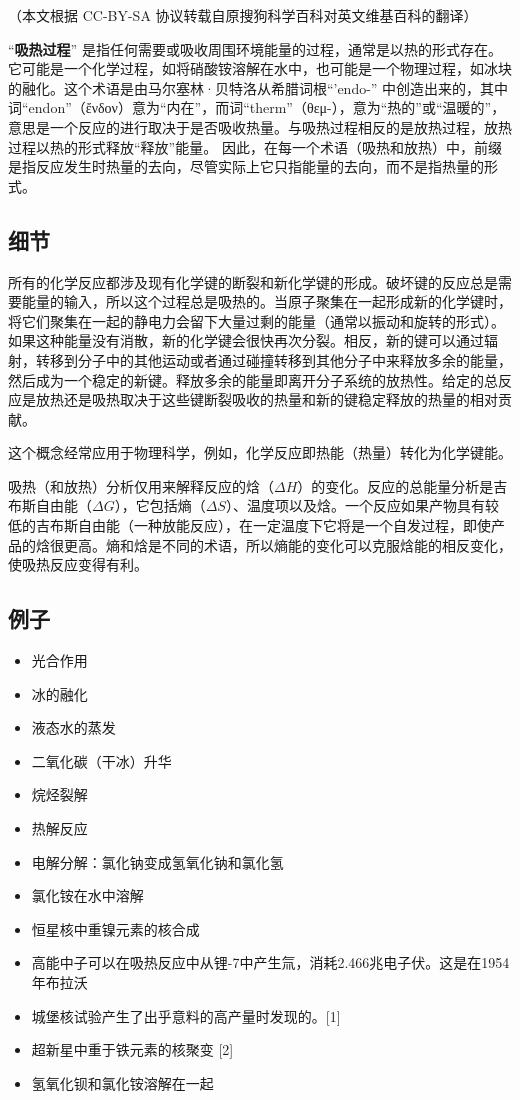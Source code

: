 
（本文根据 CC-BY-SA 协议转载自原搜狗科学百科对英文维基百科的翻译）

“\textbf{吸热过程}” 是指任何需要或吸收周围环境能量的过程，通常是以热的形式存在。它可能是一个化学过程，如将硝酸铵溶解在水中，也可能是一个物理过程，如冰块的融化。这个术语是由马尔塞林·贝特洛从希腊词根“'endo-” 中创造出来的，其中词“endon”（ἔνδον）意为“内在”，而词“therm”（θεμ-），意为“热的”或“温暖的”，意思是一个反应的进行取决于是否吸收热量。与吸热过程相反的是放热过程，放热过程以热的形式释放“释放”能量。 因此，在每一个术语（吸热和放热）中，前缀是指反应发生时热量的去向，尽管实际上它只指能量的去向，而不是指热量的形式。

\subsection{细节}
所有的化学反应都涉及现有化学键的断裂和新化学键的形成。破坏键的反应总是需要能量的输入，所以这个过程总是吸热的。当原子聚集在一起形成新的化学键时，将它们聚集在一起的静电力会留下大量过剩的能量（通常以振动和旋转的形式）。如果这种能量没有消散，新的化学键会很快再次分裂。相反，新的键可以通过辐射，转移到分子中的其他运动或者通过碰撞转移到其他分子中来释放多余的能量，然后成为一个稳定的新键。释放多余的能量即离开分子系统的放热性。给定的总反应是放热还是吸热取决于这些键断裂吸收的热量和新的键稳定释放的热量的相对贡献。

这个概念经常应用于物理科学，例如，化学反应即热能（热量）转化为化学键能。

吸热（和放热）分析仅用来解释反应的焓（$\Delta H$）的变化。反应的总能量分析是吉布斯自由能（$\Delta G$），它包括熵（$\Delta S$）、温度项以及焓。一个反应如果产物具有较低的吉布斯自由能（一种放能反应），在一定温度下它将是一个自发过程，即使产品的焓很更高。熵和焓是不同的术语，所以熵能的变化可以克服焓能的相反变化，使吸热反应变得有利。

\subsection{例子}
\begin{itemize}
\item 光合作用
\item 冰的融化
\item 液态水的蒸发
\item 二氧化碳（干冰）升华
\item 烷烃裂解
\item 热解反应
\item 电解分解：氯化钠变成氢氧化钠和氯化氢
\item 氯化铵在水中溶解
\item 恒星核中重镍元素的核合成
\item 高能中子可以在吸热反应中从锂-7中产生氚，消耗2.466兆电子伏。这是在1954年布拉沃\item 城堡核试验产生了出乎意料的高产量时发现的。[1]
\item 超新星中重于铁元素的核聚变 [2]
\item 氢氧化钡和氯化铵溶解在一起
\end{itemize}

